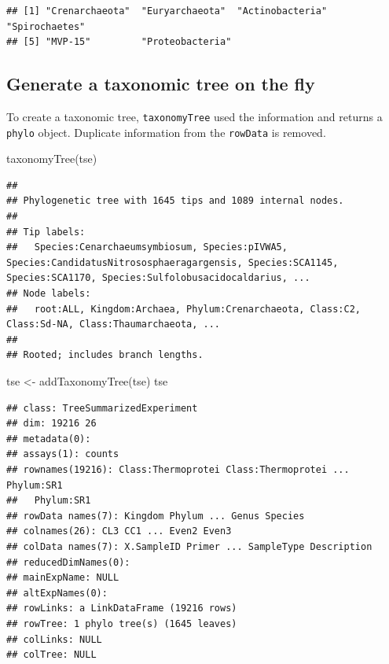 \documentclass[
]{book}
\newenvironment{Shaded}{\begin{snugshade}}{\end{snugshade}}
\newcommand{\FunctionTok}[1]{\textcolor[rgb]{0.00,0.00,0.00}{#1}}
\newcommand{\NormalTok}[1]{#1}
\newcommand{\OtherTok}[1]{\textcolor[rgb]{0.56,0.35,0.01}{#1}}
\begin{document}
\begin{verbatim}
## [1] "Crenarchaeota"  "Euryarchaeota"  "Actinobacteria" "Spirochaetes"  
## [5] "MVP-15"         "Proteobacteria"
\end{verbatim}

\hypertarget{fly-tree}{%
\subsection{Generate a taxonomic tree on the fly}\label{fly-tree}}

To create a taxonomic tree, \texttt{taxonomyTree} used the information and returns a
\texttt{phylo} object. Duplicate information from the \texttt{rowData} is removed.

\begin{Shaded}
\begin{Highlighting}[]
\FunctionTok{taxonomyTree}\NormalTok{(tse)}
\end{Highlighting}
\end{Shaded}

\begin{verbatim}
## 
## Phylogenetic tree with 1645 tips and 1089 internal nodes.
## 
## Tip labels:
##   Species:Cenarchaeumsymbiosum, Species:pIVWA5, Species:CandidatusNitrososphaeragargensis, Species:SCA1145, Species:SCA1170, Species:Sulfolobusacidocaldarius, ...
## Node labels:
##   root:ALL, Kingdom:Archaea, Phylum:Crenarchaeota, Class:C2, Class:Sd-NA, Class:Thaumarchaeota, ...
## 
## Rooted; includes branch lengths.
\end{verbatim}

\begin{Shaded}
\begin{Highlighting}[]
\NormalTok{tse }\OtherTok{\textless{}{-}} \FunctionTok{addTaxonomyTree}\NormalTok{(tse)}
\NormalTok{tse}
\end{Highlighting}
\end{Shaded}

\begin{verbatim}
## class: TreeSummarizedExperiment 
## dim: 19216 26 
## metadata(0):
## assays(1): counts
## rownames(19216): Class:Thermoprotei Class:Thermoprotei ... Phylum:SR1
##   Phylum:SR1
## rowData names(7): Kingdom Phylum ... Genus Species
## colnames(26): CL3 CC1 ... Even2 Even3
## colData names(7): X.SampleID Primer ... SampleType Description
## reducedDimNames(0):
## mainExpName: NULL
## altExpNames(0):
## rowLinks: a LinkDataFrame (19216 rows)
## rowTree: 1 phylo tree(s) (1645 leaves)
## colLinks: NULL
## colTree: NULL
\end{verbatim}
\end{document}
